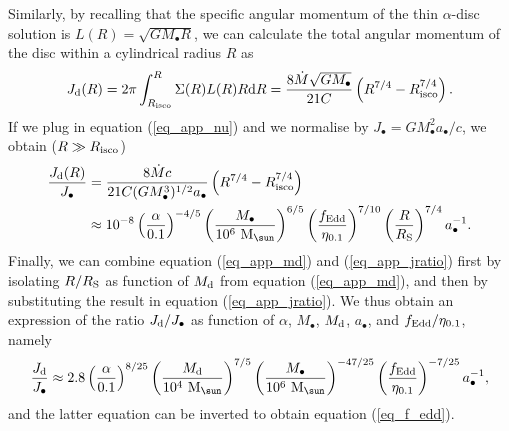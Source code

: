 \documentclass[a4paper,fleqn,usenatbib]{mnras}
\begin{document}
Similarly, by recalling that the specific angular momentum of the thin $\alpha$-disc solution is $L(R) = \sqrt{G M_{\bullet} R}$, we can calculate the total angular momentum of the disc within a cylindrical radius $R$ as
\begin{equation}
J_{\rm d}(R) = 2 \pi \int_{R_{\rm isco}}^{R} \Sigma(R) L(R) R {\rm d}R = \frac{8 \dot{M} \sqrt{G M_{\bullet}}}{21 C} \left( R^{7/4} - R_{\rm isco}^{7/4} \right).
\end{equation}
If we plug in equation (\ref{eq_app_nu}) and we normalise by $J_{\bullet} = G M_{\bullet}^2 a_\bullet / c$, we obtain ($R \gg R_{\rm isco}$)
\begin{equation} \label{eq_app_jratio}
\begin{aligned}
\frac{J_{\rm d}(R)}{J_{\bullet}} & = \frac{8 \dot{M} c}{21 C (G M_{\bullet}^3)^{1/2} a_{\bullet}} \left( R^{7/4} - R_{\rm isco}^{7/4} \right) \\
& \approx 10^{-8} \left( \frac{\alpha}{0.1} \right)^{-4/5} \left( \frac{M_{\bullet}}{10^6~{\rm M}_{\sun}} \right)^{6/5} \left( \frac{f_{\rm Edd}}{\eta_{0.1}} \right)^{7/10} \left( \frac{R}{R_{\rm S}} \right)^{7/4} a_{\bullet}^{-1}.
\end{aligned}
\end{equation}
Finally, we can combine equation (\ref{eq_app_md}) and (\ref{eq_app_jratio}) first by isolating $R/R_{\rm S}$ as function of $M_{\rm d}$ from equation (\ref{eq_app_md}), and then by substituting the result in equation (\ref{eq_app_jratio}).
We thus obtain an expression of the ratio $J_{\rm d}/J_{\bullet}$ as function of $\alpha$, $M_{\bullet}$, $M_{\rm d}$, $a_{\bullet}$, and $f_{\rm Edd}/\eta_{0.1}$, namely
\begin{equation}
\frac{J_{\rm d}}{J_{\bullet}} \approx 2.8 \left( \frac{\alpha}{0.1} \right)^{8/25} \left( \frac{M_{\rm d}}{10^4~{\rm M}_{\sun}} \right)^{7/5} \left( \frac{M_{\bullet}}{10^6~{\rm M}_{\sun}} \right)^{-47/25} \left( \frac{f_{\rm Edd}}{\eta_{0.1}} \right)^{-7/25} a_{\bullet}^{-1},
\end{equation}
and the latter equation can be inverted to obtain equation (\ref{eq_f_edd}).
\end{document}
